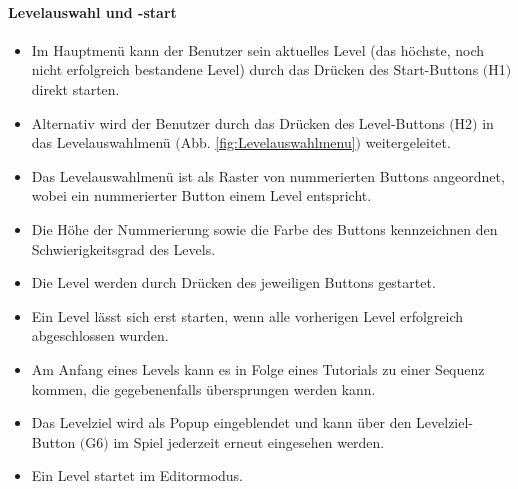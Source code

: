 \paragraph{Levelauswahl und -start}
\begin{itemize}
	\item Im Hauptmenü kann der Benutzer sein aktuelles Level (das höchste, noch nicht erfolgreich bestandene Level) durch das Drücken des Start-Buttons $($H1$)$ direkt starten.
	\item Alternativ wird der Benutzer durch das Drücken des Level-Buttons $($H2$)$ in das Levelauswahlmenü $($Abb. \ref{fig:Levelauswahlmenu}$)$ weitergeleitet.
	\item Das Levelauswahlmenü ist als Raster von nummerierten Buttons angeordnet, wobei ein nummerierter Button einem Level entspricht.
	\item Die Höhe der Nummerierung sowie die Farbe des Buttons kennzeichnen den Schwierigkeitsgrad des Levels.
	\item Die Level werden durch Drücken des jeweiligen Buttons gestartet.
	\item Ein Level lässt sich erst starten, wenn alle vorherigen Level erfolgreich abgeschlossen wurden.
	\item Am Anfang eines Levels kann es in Folge eines Tutorials zu einer Sequenz kommen, die gegebenenfalls übersprungen werden kann.
	\item Das Levelziel wird als Popup eingeblendet und kann über den Levelziel-Button $($G6$)$ im Spiel jederzeit erneut eingesehen werden.
	\item Ein Level startet im Editormodus.
\end{itemize}
